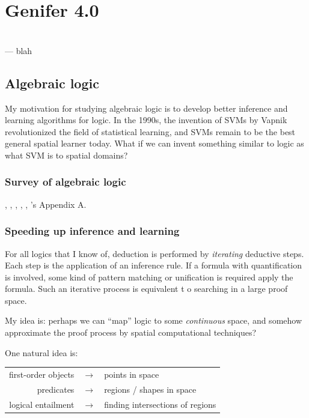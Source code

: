 \chapter{Genifer 4.0}
\begin{flushright}
\\ --- blah
\end{flushright}
\minitoc

\section{Algebraic logic}

My motivation for studying algebraic logic is to develop better inference and learning algorithms for logic.  In the 1990s, the invention of SVMs by Vapnik revolutionized the field of statistical learning, and SVMs remain to be the best general spatial learner today.  What if we can invent something similar to logic as what SVM is to spatial domains?

\subsection{Survey of algebraic logic}

\citep*{Halmos1962}, \citep*{Andreka2001}, \citep*{Halmos1988}, \citep*{Craig1974}, \citep*{Plotkin1994}, \citep*{Lawvere2003}'s Appendix A.


\subsection{Speeding up inference and learning}

For all logics that I know of, deduction is performed by \textit{iterating} deductive steps.  Each step is the application of an inference rule.  If a formula with quantification is involved, some kind of pattern matching or unification is required apply the formula.  Such an iterative process is equivalent t o searching in a large proof space.

My idea is:  perhaps we can ``map'' logic to some \textit{continuous} space, and somehow approximate the proof process by spatial computational techniques?

One natural idea is:

\tab \begin{tabular}{rll}
first-order objects & $\longrightarrow$ & points in space\\
predicates          & $\longrightarrow$ & regions / shapes in space\\
logical entailment  & $\longrightarrow$ & finding intersections of regions\\
\end{tabular}

